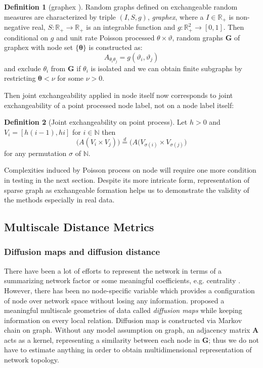 \documentclass[12pt]{article}
\theoremstyle{definition}
\newtheorem{definition}{Definition}[section]
\begin{document}
\begin{definition}[graphex \cite{kallenberg1990exchangeable}]
\label{graphex}
Random graphs defined on exchangeable random measures are characterized by triple $(I, S, g)$, \textit{graphex}, where a $I \in \mathbb{R}_{+}$ is non-negative real, $S : \mathbb{R}_{+ } \rightarrow \mathbb{R}_{+}$ is an integrable function and $g : \mathbb{R}^{2}_{+} \rightarrow [0,1]$. Then conditional on $g$ and unit rate Poisson processed $\theta \times \vartheta$, random graphs $\mathbf{G}$ of graphex with node set $\{ \mathbf{\theta} \}$ is constructed as:
\begin{equation}
A_{\theta_{i} \theta_{j}} = g(\vartheta_{i}, \vartheta_{j})
\end{equation}
and exclude $\theta_{i}$ from $\mathbf{G}$ if $\theta_{i}$ is isolated and we can obtain finite subgraphs by restricting $\mathbf{\theta}  < \nu$ for some $\nu > 0$.		
\end{definition}
Then joint exchangeability applied in node itself now corresponds to joint exchangeability of a point processed node label, not on a node label itself:
\begin{definition}[Joint exchangeability on point process]
	\label{point}
	Let $h > 0$ and  $V_{i} = [h(i-1), hi ]$ for $i \in \mathbb{N}$ then
	\begin{equation}
	\big( A( V_{i} \times V_{j}  )   \big)  \stackrel{d}{=} \big( A( V_{\sigma(i)} \times V_{\sigma(j)}     \big)
	\end{equation}	
	for any permutation $\sigma$ of $\mathbb{N}$.		
\end{definition}
Complexities induced by Poisson process on node will require one more condition in testing in the next section. Despite its more intricate form, representation of sparse graph as exchangeable formation helps us to demonstrate the validity of the methods especially in real data.

\subsection{Multiscale Distance Metrics}	

\subsubsection{Diffusion maps and diffusion distance}	
There have been a lot of efforts to represent the network in terms of a summarizing network factor \citep{hoff2002latent} or some meaningful coefficients, e.g. centrality \citep{mantzaris2013dynamic, sporns2007identification}. However, there has been no node-specific variable which provides a configuration of node over network space without losing any information. \cite{coifman2006diffusion} proposed a meaningful multiscale geometries of data called \textit{diffusion maps} while keeping information on every local relation. Diffusion map is constructed via Markov chain on graph. Without any model assumption on graph, an adjacency matrix $\boldsymbol{A}$ acts as a kernel, representing a similarity between each node in $\boldsymbol{G}$; thus we do not have to estimate anything in order to obtain multidimensional representation of network topology. 
	
\end{document}
